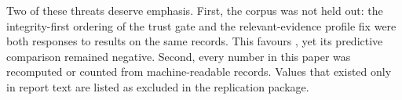 Two of these threats deserve emphasis. First, the corpus was not held out: the integrity-first ordering of the trust gate and the relevant-evidence profile fix were both responses to \ers{} results on the same records. This favours \sbg{}, yet its predictive comparison remained negative. Second, every number in this paper was recomputed or counted from machine-readable records. Values that existed only in report text are listed as excluded in the replication package.
